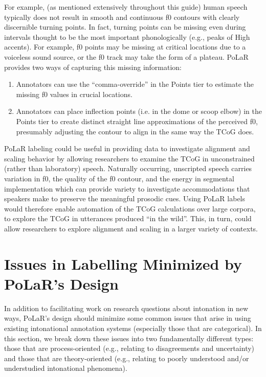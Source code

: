 \documentclass[11pt, twoside]{memoir}
\begin{document}
For example,  (as mentioned extensively throughout this guide) human speech typically does not result in smooth and continuous f0 contours with clearly discernible turning points.  In fact, turning points can be missing even during intervals thought to be the most important phonologically (e.g., peaks of High accents). For example, f0 points may be missing at critical locations due to a voiceless sound source, or the f0 track may take the form of a plateau.  PoLaR provides two ways of capturing this missing information: 

\begin{enumerate}
	\item Annotators can use the “comma-override” in the Points tier to estimate the missing f0 values in crucial locations.
	\item Annotators can place inflection points (i.e. in the dome or scoop elbow) in the Points tier to create distinct straight line approximations of the perceived f0, presumably adjusting the contour to align in the same way the TCoG does.
\end{enumerate}

PoLaR labeling could be useful in providing data to investigate alignment and scaling behavior by allowing researchers to examine the TCoG in unconstrained (rather than laboratory) speech. Naturally occurring, unscripted speech carries variation in f0, the quality of the f0 contour, and the energy in segmental implementation which can provide variety to investigate accommodations that speakers make to preserve the meaningful prosodic cues.  Using PoLaR labels would therefore enable automation of the TCoG calculations over large corpora, to explore the TCoG in utterances produced “in the wild”. This, in turn, could allow researchers to explore alignment and scaling in a larger variety of contexts. 


\section{Issues in Labelling Minimized by PoLaR’s Design}\label{sec:logistical-issues-in-labelling}

In addition to facilitating work on research questions about intonation in new ways, PoLaR’s design should minimize some common issues that arise in using existing intonational annotation systems (especially those that are categorical). In this section, we break down these issues into two fundamentally different types: those that are process-oriented (e.g., relating to disagreements and uncertainty) and those that are theory-oriented (e.g., relating to poorly understood and/or understudied intonational phenomena).
\end{document}
